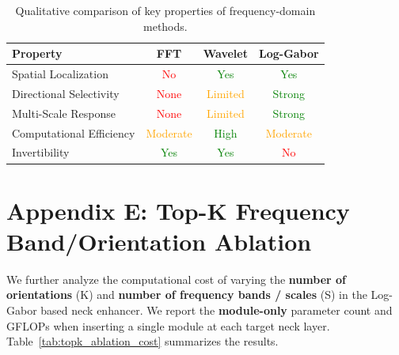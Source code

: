 \documentclass{article}
\theoremstyle{plain}
\theoremstyle{definition}
\theoremstyle{remark}
\begin{document}
\begin{table}[h]
\centering
\caption{Qualitative comparison of key properties of frequency-domain methods.}
\label{tab:freq_properties}
\vspace{0.1cm}
\small
\begin{tabular}{@{}lccc@{}}
\toprule
\cellcolor{blue!5}\textbf{Property} & \cellcolor{blue!5}\textbf{FFT} & \cellcolor{blue!5}\textbf{Wavelet} & \cellcolor{blue!5}\textbf{Log-Gabor} \\
\midrule
Spatial Localization & \textcolor{red}{No} & \textcolor{green}{Yes} & \textcolor{green}{Yes} \\
Directional Selectivity & \textcolor{red}{None} & \textcolor{orange}{Limited} & \textcolor{green}{Strong} \\
Multi-Scale Response & \textcolor{red}{None} & \textcolor{orange}{Limited} & \textcolor{green}{Strong} \\
Computational Efficiency & \textcolor{orange}{Moderate} & \textcolor{green}{High} & \textcolor{orange}{Moderate} \\
Invertibility & \textcolor{green}{Yes} & \textcolor{green}{Yes} & \textcolor{red}{No} \\
\bottomrule
\end{tabular}
\end{table}

\section{Appendix E: Top-K Frequency Band/Orientation Ablation}
\label{sec:appendix_e_topk}

We further analyze the computational cost of varying the \textbf{number of orientations} (K) and \textbf{number of frequency bands / scales} (S) in the Log-Gabor based neck enhancer. We report the \textbf{module-only} parameter count and GFLOPs when inserting a single module at each target neck layer.
Table~\ref{tab:topk_ablation_cost} summarizes the results.
\end{document}
